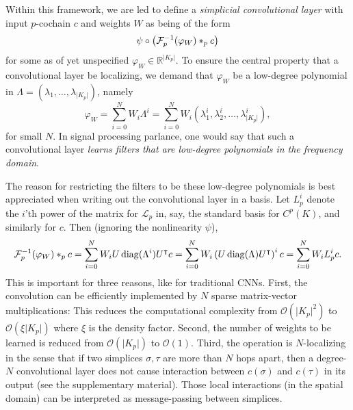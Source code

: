 Within this framework, we are led to define a \emph{simplicial convolutional layer} with input $p$-cochain $c$ and weights $W$ as being of the form
\begin{equation*}
  \psi\circ\left(\mathcal{F}^{-1}_p(\varphi_W)\ast_p c\right)
  \end{equation*}
for some as of yet unspecified $\varphi_W\in\mathbb{R}^{\lvert K_p \rvert}$. To ensure the central property that a convolutional layer be localizing, we demand that $\varphi_W$ be a low-degree polynomial in $\Lambda=(\lambda_1, \dotsc, \lambda_{\lvert K_p \rvert})$, namely
\begin{equation*}
  \varphi_W = \sum_{i=0}^N W_i\Lambda^i = \sum_{i=0}^N W_i(\lambda^i_1, \lambda^i_2, \dotsc, \lambda^i_{\lvert K_p \rvert}),
\end{equation*}
for small $N$. In signal processing parlance, one would say that such a convolutional layer \emph{learns filters that are low-degree polynomials in the frequency domain}.

The reason for restricting the filters to be these low-degree polynomials is best appreciated when writing out the convolutional layer in a basis. Let $L^i_p$ denote the $i$'th power of the matrix for $\mathcal{L}_p$ in, say, the standard basis for $C^p(K)$, and similarly for $c$. Then (ignoring the nonlinearity $\psi$), 
\begin{equation*}
  \mathcal{F}\inv_p(\varphi_W)\ast_p c = \sum_{i=0}^N W_iU\diag(\Lambda^i)U\transpose c = \sum_{i=0}^N W_i\left(U\diag(\Lambda)U\transpose\right)^i c = \sum_{i=0}^NW_iL^i_pc. %
\end{equation*}
This is important for three reasons, like for traditional CNNs.
First, the convolution can be efficiently implemented by $N$ sparse matrix-vector multiplications: This reduces the computational complexity from $\mathcal{O}(\lvert K_p\rvert^2)$ to $\mathcal{O}(\xi\lvert K_p\rvert)$ where $\xi$ is the density factor.
Second, the number of weights to be learned is reduced from $\mathcal{O}(\lvert K_p\rvert)$ to $\mathcal{O}(1)$.
Third, the operation is $N$-localizing in the sense that if two simplices $\sigma,\tau$ are more than $N$ hops apart, then a degree-$N$ convolutional layer does not cause interaction between $c(\sigma)$ and $c(\tau)$ in its output (see the supplementary material).
Those local interactions (in the spatial domain) can be interpreted as message-passing between simplices.%

